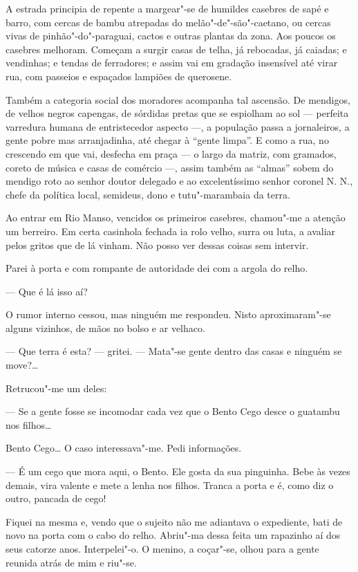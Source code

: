 A estrada principia de repente a margear"-se de humildes casebres de sapé
e barro, com cercas de bambu atrepadas do melão"-de"-são"-caetano, ou
cercas vivas de pinhão"-do"-paraguai, cactos e outras plantas da zona. Aos
poucos os casebres melhoram. Começam a surgir casas de telha, já
rebocadas, já caiadas; e vendinhas; e tendas de ferradores; e assim vai
em gradação insensível até virar rua, com passeios e espaçados lampiões
de querosene.

Também a categoria social dos moradores acompanha tal ascensão. De
mendigos, de velhos negros capengas, de sórdidas pretas que se espiolham
ao sol --- perfeita varredura humana de entristecedor aspecto ---, a
população passa a jornaleiros, a gente pobre mas arranjadinha, até
chegar à ``gente limpa''. E como a rua, no crescendo em que vai,
desfecha em praça --- o largo da matriz, com gramados, coreto de música
e casas de comércio ---, assim também as ``almas'' sobem do mendigo roto
ao senhor doutor delegado e ao excelentíssimo senhor coronel N. N.,
chefe da política local, semideus, dono e tutu"-marambaia da terra.

Ao entrar em Rio Manso, vencidos os primeiros casebres, chamou"-me a
atenção um berreiro. Em certa casinhola fechada ia rolo velho, surra ou
luta, a avaliar pelos gritos que de lá vinham. Não posso ver dessas
coisas sem intervir.

Parei à porta e com rompante de autoridade dei com a argola do relho.

--- Que é lá isso aí?

O rumor interno cessou, mas ninguém me respondeu. Nisto aproximaram"-se
alguns vizinhos, de mãos no bolso e ar velhaco.

--- Que terra é esta? --- gritei. --- Mata"-se gente dentro das casas e
ninguém se move?\ldots{}

Retrucou"-me um deles:

--- Se a gente fosse se incomodar cada vez que o Bento Cego desce o
guatambu nos filhos\ldots{}

Bento Cego\ldots{} O caso interessava"-me. Pedi informações.

--- É um cego que mora aqui, o Bento. Ele gosta da sua pinguinha. Bebe
às vezes demais, vira valente e mete a lenha nos filhos. Tranca a porta
e é, como diz o outro, pancada de cego!

Fiquei na mesma e, vendo que o sujeito não me adiantava o expediente,
bati de novo na porta com o cabo do relho. Abriu"-ma dessa feita um
rapazinho aí dos seus catorze anos. Interpelei"-o. O menino, a coçar"-se,
olhou para a gente reunida atrás de mim e riu"-se.

